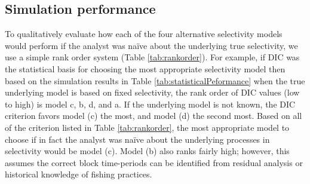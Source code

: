 \documentclass[review,letterpaper,10pt,authoryear]{elsarticle}
\begin{document}



\subsection*{Simulation performance} %
\label{sub:simulation_performance}




To qualitatively evaluate how each of the four alternative selectivity models would perform if the analyst was na\"ive about the underlying true selectivity, we use a simple rank order system (Table \ref{tab:rankorder}).  For example, if DIC was the statistical basis for choosing the most appropriate selectivity model then based on the simulation results in Table \ref{tab:statisticalPeformance} when the true underlying model is based on fixed selectivity, the rank order of DIC values (low to high) is model c, b, d, and a. If the underlying model is not known, the DIC criterion favors model (c) the most, and model (d) the second most.    Based on all of the criterion listed in Table \ref{tab:rankorder}, the most appropriate model to choose if in fact the analyst was na\"ive about the underlying processes in selectivity would be model (c).    Model (b) also ranks fairly high; however, this assumes the correct block time-periods can be identified from residual analysis or historical knowledge of fishing practices.
\end{document}
